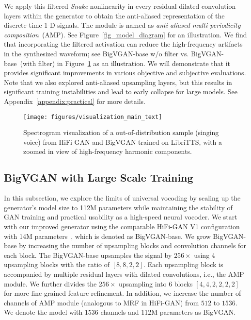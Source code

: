 \documentclass{article} \usepackage{iclr2023_conference,times}
\theoremstyle{plain}
\theoremstyle{definition}
\theoremstyle{remark}
\begin{document}
We apply this filtered \emph{Snake} nonlinearity in every residual dilated convolution layers within the generator to obtain the anti-aliased representation of the discrete-time 1-D signals. The module is named as \emph{anti-aliased multi-periodicity composition}~(AMP). See Figure~\ref{fig_model_diagram} for an illustration. 
We find that incorporating the filtered activation can reduce the high-frequency artifacts in the synthesized waveform; see BigVGAN-base w/o filter vs. BigVGAN-base~(with filter) in Figure~\ref{fig_visualization_main_text} as an illustration.
We will demonstrate that it provides significant improvements in various objective and subjective evaluations.
Note that we also explored anti-aliased upsampling layers, but this results in significant training instabilities and lead to early collapse for large models. See Appendix~\ref{appendix:practical} for more details.


\begin{figure}[t]
\vspace{-.4cm}
\centering
\texttt{[image: figures/visualization\_main\_text]}
\vspace{-.7cm}
\caption{Spectrogram visualization of a out-of-distribution sample (singing voice) from HiFi-GAN and BigVGAN trained on LibriTTS, with a zoomed in view of high-frequency harmonic components.}
\label{fig_visualization_main_text}
\end{figure}


\vspace{-.2cm}
\subsection{BigVGAN with Large Scale Training}
\vspace{-.2cm}
In this subsection, we explore the limits of universal vocoding by scaling up the generator's model size to 112M parameters while maintaining the stability of GAN training and practical usability as a high-speed neural vocoder. We start with our improved generator using the comparable HiFi-GAN V1 configuration with 14M parameters~\citep{kong2020hifi}, which is denoted as BigVGAN-base.
We grow BigVGAN-base by increasing the number of upsampling blocks and convolution channels for each block. The BigVGAN-base upsamples the signal by $256\times$ using 4 upsampling blocks with the ratio of $[8, 8, 2, 2]$. Each upsampling block is accompanied by  multiple residual layers with dilated convolutions, i.e., the AMP module. 
We further divides the $256\times$ upsampling into 6 blocks $[4, 4, 2, 2, 2, 2]$ for more fine-grained feature refinement. 
In addition, we increase the number of channels of AMP module (analogous to MRF in HiFi-GAN) from $512$ to $1536$.
We denote the model with $1536$ channels and 112M parameters as BigVGAN.
\end{document}
